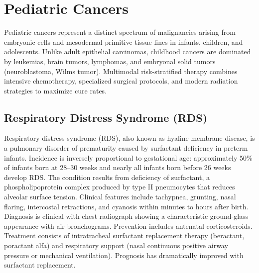 \section{Pediatric Cancers}




Pediatric cancers represent a distinct spectrum of malignancies arising from embryonic cells and mesodermal primitive tissue lines in infants, children, and adolescents. Unlike adult epithelial carcinomas, childhood cancers are dominated by leukemias, brain tumors, lymphomas, and embryonal solid tumors (neuroblastoma, Wilms tumor). Multimodal risk-stratified therapy combines intensive chemotherapy, specialized surgical protocols, and modern radiation strategies to maximize cure rates.





\label{sec:Pediatric Cancers}

\subsection{Respiratory Distress Syndrome (RDS)}
\label{sec:Respiratory Distress Syndrome}
Respiratory distress syndrome (RDS), also known as hyaline membrane disease, is a pulmonary disorder of prematurity caused by surfactant deficiency in preterm infants. Incidence is inversely proportional to gestational age: approximately 50\% of infants born at 28--30 weeks and nearly all infants born before 26 weeks develop RDS. The condition results from deficiency of surfactant, a phospholipoprotein complex produced by type II pneumocytes that reduces alveolar surface tension. Clinical features include tachypnea, grunting, nasal flaring, intercostal retractions, and cyanosis within minutes to hours after birth. Diagnosis is clinical with chest radiograph showing a characteristic ground-glass appearance with air bronchograms. Prevention includes antenatal corticosteroids. Treatment consists of intratracheal surfactant replacement therapy (beractant, poractant alfa) and respiratory support (nasal continuous positive airway pressure or mechanical ventilation). Prognosis has dramatically improved with surfactant replacement.

